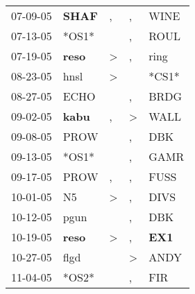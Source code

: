 \begin{supertabular}{p{0.07\textwidth}p{0.06\textwidth}p{0.02\textwidth}p{0.02\textwidth}p{0.06\textwidth}}
          07-09-05\textsuperscript{} &  \textbf{SHAF\textsuperscript{}} &                , &                , &           WINE\textsuperscript{} \\
          07-13-05\textsuperscript{} &                            *OS1* &                  &                , &           ROUL\textsuperscript{} \\
          07-19-05\textsuperscript{} &  \textbf{reso\textsuperscript{}} &     \textgreater &                , &           ring\textsuperscript{} \\
          08-23-05\textsuperscript{} &           hnsl\textsuperscript{} &     \textgreater &                  &                            *CS1* \\
          08-27-05\textsuperscript{} &           ECHO\textsuperscript{} &                  &                , &           BRDG\textsuperscript{} \\
          09-02-05\textsuperscript{} &  \textbf{kabu\textsuperscript{}} &                , &     \textgreater &           WALL\textsuperscript{} \\
          09-08-05\textsuperscript{} &           PROW\textsuperscript{} &                  &                , &            DBK\textsuperscript{} \\
          09-13-05\textsuperscript{} &                            *OS1* &                  &                , &           GAMR\textsuperscript{} \\
          09-17-05\textsuperscript{} &           PROW\textsuperscript{} &                , &                , &           FUSS\textsuperscript{} \\
          10-01-05\textsuperscript{} &             N5\textsuperscript{} &     \textgreater &                , &           DIVS\textsuperscript{} \\
          10-12-05\textsuperscript{} &           pgun\textsuperscript{} &                  &                , &            DBK\textsuperscript{} \\
          10-19-05\textsuperscript{} &  \textbf{reso\textsuperscript{}} &     \textgreater &                , &   \textbf{EX1\textsuperscript{}} \\
          10-27-05\textsuperscript{} &           flgd\textsuperscript{} &                  &     \textgreater &           ANDY\textsuperscript{} \\
          11-04-05\textsuperscript{} &                            *OS2* &                  &                , &            FIR\textsuperscript{} \\

\end{supertabular}
